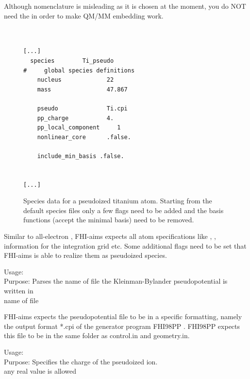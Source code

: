 Although nomenclature is misleading as it is chosen at the moment, you do NOT need the 
in order to make QM/MM embedding work. 




\begin{figure}[hb]
  \small
  \begin{verbatim}


[...]
  species        Ti_pseudo
#     global species definitions
    nucleus             22
    mass                47.867

    pseudo              Ti.cpi
    pp_charge           4.
    pp_local_component     1
    nonlinear_core      .false.

    include_min_basis .false.


[...]

  \end{verbatim}
  \normalsize

  \vspace*{-4.0ex}

  \caption{\label{Fig:control.in_qmmm}
Species data for a pseudoized titanium atom. Starting from the default species files 
only a few flags need to be added and the basis functions (accept the minimal basis) 
need to be removed.
  }
\end{figure}


Similar to all-electron , FHI-aims expects all atom specifications  
like , , information for the integration grid etc.
Some additional flags need to be set that FHI-aims is able to realize them as pseudoized species.  

{
  \noindent
  Usage:   \\[1.0ex]
  Purpose: Parses the name of file the Kleinman-Bylander pseudopotential 
is written in \\[1.0ex]
   name of file\\
}

FHI-aims expects the pseudopotential file to be in a specific formatting, namely the 
output format *.cpi of the generator program FHI98PP \cite{FuchsFHI98PP}.
FHI98PP expects this file to be in the same folder as control.in and geometry.in.

{
   \noindent
   Usage:   \\[1.0ex]
   Purpose: Specifies the charge of the pseudoized ion. \\[1.0ex]
    any real value is allowed\\
 }

